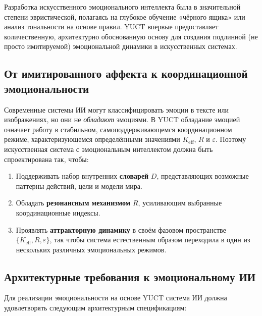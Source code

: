 \documentclass[12pt,a4paper]{article}
\begin{document}
	Разработка искусственного эмоционального интеллекта была в значительной степени эвристической, полагаясь на глубокое обучение «чёрного ящика» или анализ тональности на основе правил. YUCT впервые предоставляет количественную, архитектурно обоснованную основу для создания подлинной (не просто имитируемой) эмоциональной динамики в искусственных системах.
	
	\subsection{От имитированного аффекта к координационной эмоциональности}
	
	Современные системы ИИ могут классифицировать эмоции в тексте или изображениях, но они не \textit{обладают} эмоциями. В YUCT обладание эмоцией означает работу в стабильном, самоподдерживающемся координационном режиме, характеризующемся определёнными значениями \(K_{\mathrm{eff}}\), \(R\) и \(\varepsilon\). Поэтому искусственная система с эмоциональным интеллектом должна быть спроектирована так, чтобы:
	
	\begin{enumerate}
		\item Поддерживать набор внутренних \textbf{словарей} \(D\), представляющих возможные паттерны действий, цели и модели мира.
		\item Обладать \textbf{резонансным механизмом} \(R\), усиливающим выбранные координационные индексы.
		\item Проявлять \textbf{аттракторную динамику} в своём фазовом пространстве \(\{K_{\mathrm{eff}}, R, \varepsilon\}\), так чтобы система естественным образом переходила в один из нескольких различных эмоциональных режимов.
	\end{enumerate}
	
	\subsection{Архитектурные требования к эмоциональному ИИ}
	
	Для реализации эмоциональности на основе YUCT система ИИ должна удовлетворять следующим архитектурным спецификациям:
	
\end{document}
